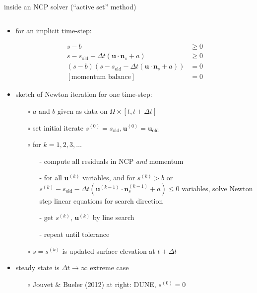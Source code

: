\documentclass[10pt,hyperref,dvipsnames]{beamer}
\newcommand{\bn}{\mathbf{n}}
\newcommand{\bu}{\mathbf{u}}
\begin{document}
\begin{frame}{inside an NCP solver (``active set'' method)}

\begin{columns}
\begin{column}{0.7\textwidth}
\begin{itemize}
\item for an implicit time-step:

\vspace{-8mm}
\small
\begin{align*}
s-b &\ge 0 \\
s - s_{\text{old}} - \Delta t\left(\bu \cdot \bn_s + a\right) &\ge 0 \\
(s-b) \left(s - s_{\text{old}} - \Delta t\left(\bu \cdot \bn_s + a\right)\right) &= 0 \\
[\text{momentum balance}] &= 0
\end{align*}
\normalsize
\item sketch of Newton iteration for one time-step:
    \begin{itemize}
    \item[$\circ$] $a$ and $b$ given as data on $\Omega \times [t,t+\Delta t]$
    \item[$\circ$] set initial iterate $s^{(0)}=s_{\text{old}}, \bu^{(0)}=\bu_{\text{old}}$
    \item[$\circ$] for $k=1,2,3,\dots$
        \begin{itemize}
        \item[-] compute all residuals in NCP \emph{and} momentum
        \item[-] for all $\bu^{(k)}$ variables, and for $s^{(k)}>b$ or $s^{(k)} - s_{\text{old}} - \Delta t\left(\bu^{(k-1)} \cdot \bn_s^{(k-1)} + a\right) \le 0$ variables, solve Newton step linear equations for search direction
        \item[-] get $s^{(k)}$, $\bu^{(k)}$ by line search
        \item[-] repeat until tolerance
        \end{itemize}
    \item[$\circ$] $s=s^{(k)}$ is updated surface elevation at $t+\Delta t$
    \end{itemize}
\item steady state is $\Delta t \to \infty$ extreme case
    \begin{itemize}
    \item[$\circ$] Jouvet \& Bueler (2012) at right: DUNE, $s^{(0)}=0$
    \end{itemize}


\end{itemize}
\end{column}
\end{columns}
\end{frame}
\end{document}
